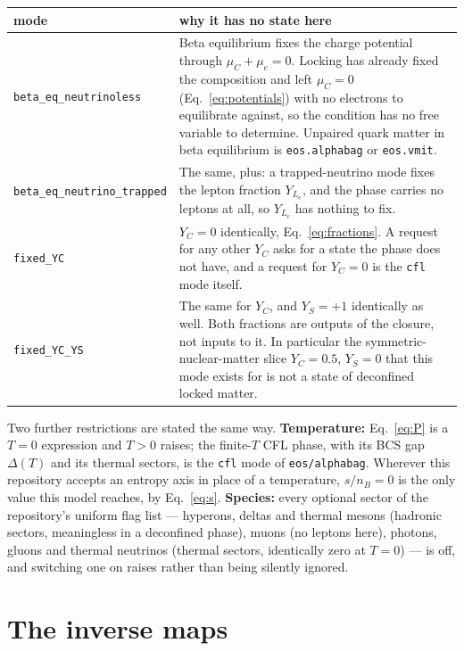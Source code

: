\documentclass[aps,prc,onecolumn,superscriptaddress,nofootinbib,10pt]{revtex4-2}
\newcommand{\nB}{n_B}
\newcommand{\muC}{\mu_C}
\begin{document}
\begin{center}
\begin{tabular}{p{}p{}}
\toprule
mode & why it has no state here \\
\midrule
\texttt{beta\_eq\_neutrinoless}
  & Beta equilibrium fixes the charge potential through $\muC + \mu_e = 0$.
    Locking has already fixed the composition and left $\muC = 0$
    (Eq.~\ref{eq:potentials}) with no electrons to equilibrate against, so
    the condition has no free variable to determine. Unpaired quark matter in
    beta equilibrium is \texttt{eos.alphabag} or \texttt{eos.vmit}. \\[4pt]
\texttt{beta\_eq\_neutrino\_trapped}
  & The same, plus: a trapped-neutrino mode fixes the lepton fraction
    $Y_{L_e}$, and the phase carries no leptons at all, so $Y_{L_e}$ has
    nothing to fix. \\[4pt]
\texttt{fixed\_YC}
  & $Y_C = 0$ identically, Eq.~\eqref{eq:fractions}. A request for any other
    $Y_C$ asks for a state the phase does not have, and a request for
    $Y_C = 0$ is the \texttt{cfl} mode itself. \\[4pt]
\texttt{fixed\_YC\_YS}
  & The same for $Y_C$, and $Y_S = +1$ identically as well. Both fractions
    are outputs of the closure, not inputs to it. In particular the
    symmetric-nuclear-matter slice $Y_C = 0.5$, $Y_S = 0$ that this mode
    exists for is not a state of deconfined locked matter. \\
\bottomrule
\end{tabular}
\end{center}

\noindent
Two further restrictions are stated the same way. \textbf{Temperature:}
Eq.~\eqref{eq:P} is a $T = 0$ expression and $T > 0$ raises; the finite-$T$
CFL phase, with its BCS gap $\Delta(T)$ and its thermal sectors, is the
\texttt{cfl} mode of \texttt{eos/alphabag}. Wherever this repository accepts
an entropy axis in place of a temperature, $s/\nB = 0$ is the only value this
model reaches, by Eq.~\eqref{eq:s}. \textbf{Species:} every optional sector of
the repository's uniform flag list --- hyperons, deltas and thermal mesons
(hadronic sectors, meaningless in a deconfined phase), muons (no leptons
here), photons, gluons and thermal neutrinos (thermal sectors, identically
zero at $T = 0$) --- is off, and switching one on raises rather than being
silently ignored.

\section{The inverse maps}
\label{sec:inverse}
\end{document}
